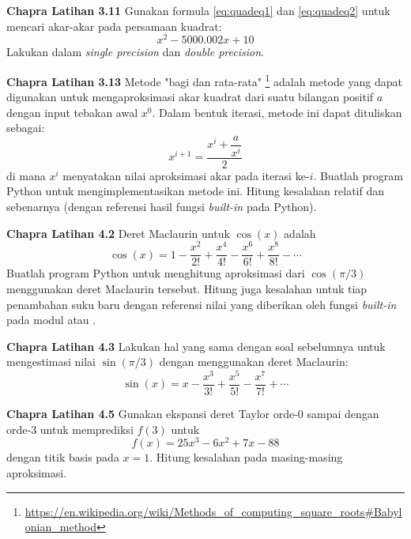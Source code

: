 \begin{soal}
\textbf{Chapra Latihan 3.11}
Gunakan formula \eqref{eq:quadeq1} dan \eqref{eq:quadeq2} untuk mencari akar-akar
pada persamaan kuadrat:
\begin{equation*}
x^2 - 5000.002x + 10
\end{equation*}
Lakukan dalam \textit{single precision} dan \textit{double precision}.
\end{soal}


\begin{soal}
\textbf{Chapra Latihan 3.13}
Metode "bagi dan rata-rata"
\footnote{{\scriptsize\url{https://en.wikipedia.org/wiki/Methods_of_computing_square_roots\#Babylonian_method}}}
adalah metode yang dapat digunakan untuk
mengaproksimasi akar kuadrat dari suatu bilangan positif $a$ dengan input
tebakan awal $x^{0}$. 
Dalam bentuk iterasi, metode ini dapat dituliskan sebagai:
\begin{equation}
x^{i+1} = \dfrac{x^{i} + \dfrac{a}{x^{i}}}{2}
\end{equation}
di mana $x^{i}$ menyatakan nilai aproksimasi akar pada iterasi ke-$i$.
Buatlah program Python untuk mengimplementasikan metode ini.
Hitung kesalahan relatif dan sebenarnya (dengan referensi hasil fungsi
\textit{built-in}  pada Python).
\end{soal}

\begin{soal}
\textbf{Chapra Latihan 4.2}
Deret Maclaurin untuk $\cos(x)$ adalah
\begin{equation*}
\cos(x) = 1 - \frac{x^2}{2!} + \frac{x^4}{4!} - \frac{x^6}{6!} + \frac{x^8}{8!} - \cdots
\end{equation*}
Buatlah program Python untuk menghitung aproksimasi dari $\cos(\pi/3)$ menggunakan deret
Maclaurin tersebut. Hitung juga kesalahan untuk tiap penambahan suku baru dengan referensi
nilai yang diberikan oleh fungsi \textit{built-in} pada modul  atau
.
\end{soal}


\begin{soal}
\textbf{Chapra Latihan 4.3}
Lakukan hal yang sama dengan soal sebelumnya untuk mengestimasi nilai $\sin(\pi/3)$
dengan menggunakan deret Maclaurin:
\begin{equation*}
\sin(x) = x - \frac{x^3}{3!} + \frac{x^5}{5!} - \frac{x^7}{7!} + \cdots
\end{equation*}
\end{soal}

\begin{soal}
\textbf{Chapra Latihan 4.5}
Gunakan ekspansi deret Taylor orde-0 sampai dengan orde-3 untuk
memprediksi $f(3)$ untuk
\begin{equation*}
f(x) = 25x^3 - 6x^2 + 7x - 88
\end{equation*}
dengan titik basis pada $x=1$. Hitung kesalahan pada masing-masing aproksimasi.
\end{soal}

